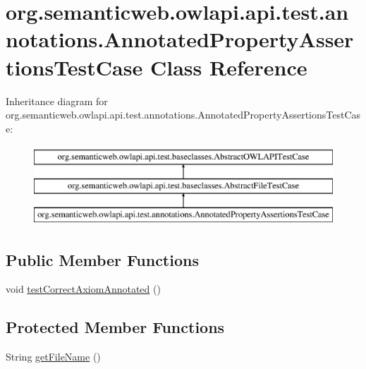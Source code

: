 \hypertarget{classorg_1_1semanticweb_1_1owlapi_1_1api_1_1test_1_1annotations_1_1_annotated_property_assertions_test_case}{\section{org.\-semanticweb.\-owlapi.\-api.\-test.\-annotations.\-Annotated\-Property\-Assertions\-Test\-Case Class Reference}
\label{classorg_1_1semanticweb_1_1owlapi_1_1api_1_1test_1_1annotations_1_1_annotated_property_assertions_test_case}
}
Inheritance diagram for org.\-semanticweb.\-owlapi.\-api.\-test.\-annotations.\-Annotated\-Property\-Assertions\-Test\-Case\-:\begin{figure}[H]
\begin{center}
\leavevmode
\includegraphics[height=3.000000cm]{classorg_1_1semanticweb_1_1owlapi_1_1api_1_1test_1_1annotations_1_1_annotated_property_assertions_test_case}
\end{center}
\end{figure}
\subsection*{Public Member Functions}
\begin{DoxyCompactItemize}
\item 
void \hyperlink{classorg_1_1semanticweb_1_1owlapi_1_1api_1_1test_1_1annotations_1_1_annotated_property_assertions_test_case_a834b43787625b8af016444681bbfb73c}{test\-Correct\-Axiom\-Annotated} ()
\end{DoxyCompactItemize}
\subsection*{Protected Member Functions}
\begin{DoxyCompactItemize}
\item 
String \hyperlink{classorg_1_1semanticweb_1_1owlapi_1_1api_1_1test_1_1annotations_1_1_annotated_property_assertions_test_case_a3be7d1b9de316f5c5bf9dbd8f2636093}{get\-File\-Name} ()
\end{DoxyCompactItemize}


